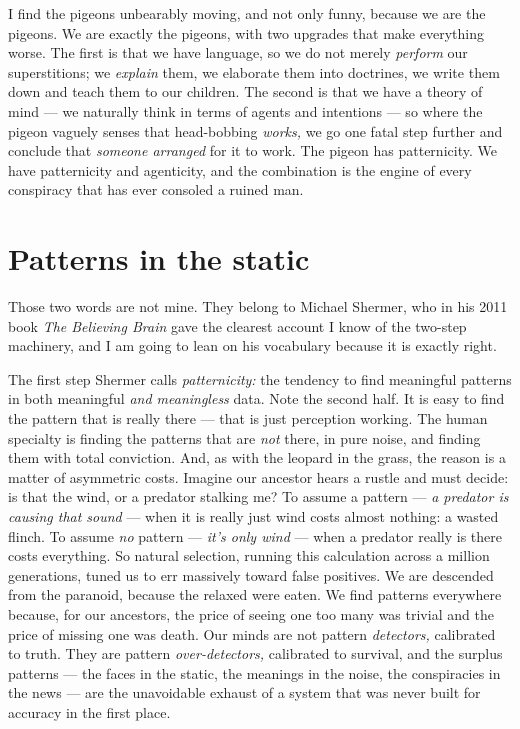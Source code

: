 I find the pigeons unbearably moving, and not only funny, because we are the pigeons. We are exactly the pigeons, with two upgrades that make everything worse. The first is that we have language, so we do not merely \emph{perform} our superstitions; we \emph{explain} them, we elaborate them into doctrines, we write them down and teach them to our children. The second is that we have a theory of mind — we naturally think in terms of agents and intentions — so where the pigeon vaguely senses that head-bobbing \emph{works,} we go one fatal step further and conclude that \emph{someone arranged} for it to work. The pigeon has patternicity. We have patternicity and agenticity, and the combination is the engine of every conspiracy that has ever consoled a ruined man.

\section*{Patterns in the static}

Those two words are not mine. They belong to Michael Shermer, who in his 2011 book \emph{The Believing Brain} gave the clearest account I know of the two-step machinery, and I am going to lean on his vocabulary because it is exactly right.

The first step Shermer calls \emph{patternicity:} the tendency to find meaningful patterns in both meaningful \emph{and meaningless} data. Note the second half. It is easy to find the pattern that is really there — that is just perception working. The human specialty is finding the patterns that are \emph{not} there, in pure noise, and finding them with total conviction. And, as with the leopard in the grass, the reason is a matter of asymmetric costs. Imagine our ancestor hears a rustle and must decide: is that the wind, or a predator stalking me? To assume a pattern — \emph{a predator is causing that sound} — when it is really just wind costs almost nothing: a wasted flinch. To assume \emph{no} pattern — \emph{it's only wind} — when a predator really is there costs everything. So natural selection, running this calculation across a million generations, tuned us to err massively toward false positives. We are descended from the paranoid, because the relaxed were eaten. We find patterns everywhere because, for our ancestors, the price of seeing one too many was trivial and the price of missing one was death. Our minds are not pattern \emph{detectors,} calibrated to truth. They are pattern \emph{over-detectors,} calibrated to survival, and the surplus patterns — the faces in the static, the meanings in the noise, the conspiracies in the news — are the unavoidable exhaust of a system that was never built for accuracy in the first place.

